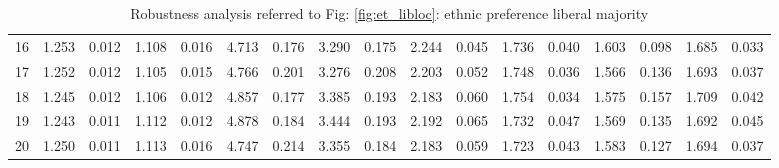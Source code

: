 \documentclass{article}
\begin{document}
\begin{table}[H]
{\begin{tabular}{|c|c|c|c|c|c|c|c|c|c|c|c|c|c|c|c|c|}
    16 & 1.253 & 0.012 & 1.108 & 0.016 & 4.713 & 0.176 & 3.290 & 0.175 & 2.244 & 0.045 & 1.736 & 0.040 & 1.603 & 0.098 & 1.685 & 0.033 \\ 
    17 & 1.252 & 0.012 & 1.105 & 0.015 & 4.766 & 0.201 & 3.276 & 0.208 & 2.203 & 0.052 & 1.748 & 0.036 & 1.566 & 0.136 & 1.693 & 0.037 \\ 
    18 & 1.245 & 0.012 & 1.106 & 0.012 & 4.857 & 0.177 & 3.385 & 0.193 & 2.183 & 0.060 & 1.754 & 0.034 & 1.575 & 0.157 & 1.709 & 0.042 \\ 
    19 & 1.243 & 0.011 & 1.112 & 0.012 & 4.878 & 0.184 & 3.444 & 0.193 & 2.192 & 0.065 & 1.732 & 0.047 & 1.569 & 0.135 & 1.692 & 0.045 \\ 
    20 & 1.250 & 0.011 & 1.113 & 0.016 & 4.747 & 0.214 & 3.355 & 0.184 & 2.183 & 0.059 & 1.723 & 0.043 & 1.583 & 0.127 & 1.694 & 0.037 \\ 
   \hline
\end{tabular}
}

\caption{Robustness analysis referred to Fig: \ref{fig:et_libloc}: ethnic preference liberal majority}
\label{tab:et_libloc}

\end{table}
\end{document}
